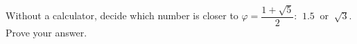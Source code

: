 Without a calculator, decide which number is closer to $\varphi=\dfrac{1+\sqrt5}{2}$: $\ 1.5\ $ or $\ \sqrt3$. Prove your answer.
